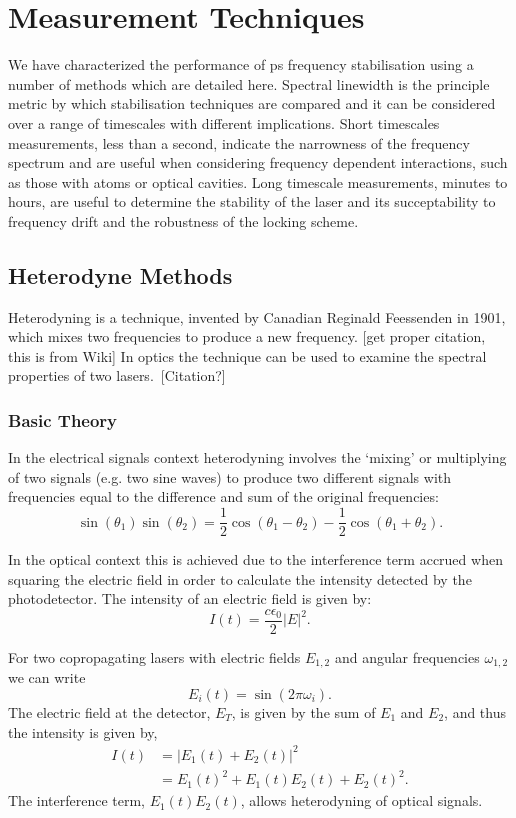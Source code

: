 \section{Measurement Techniques}
We have characterized the performance of \gls*{ps} frequency stabilisation using a number of methods which are detailed here.
Spectral linewidth is the principle metric by which stabilisation techniques are compared and it can be considered over a range of timescales with different implications.
Short timescales measurements, less than a second, indicate the narrowness of the frequency spectrum and are useful when considering frequency dependent interactions, such as those with atoms or optical cavities.
Long timescale measurements, minutes to hours, are useful to determine the stability of the laser and its succeptability to frequency drift and the robustness of the locking scheme.

\subsection{Heterodyne Methods}

Heterodyning is a technique, invented by Canadian Reginald Feessenden in 1901, which mixes two frequencies to produce a new frequency. {\color{red} [get proper citation, this is from Wiki]} In optics the technique can be used to examine the spectral properties of two lasers.~{\color{red}[Citation?]}

\subsubsection{Basic Theory}
In the electrical signals context heterodyning involves the `mixing' or multiplying of two signals (e.g. two sine waves) to produce two different signals with frequencies equal to the difference and sum of the original frequencies:
\begin{equation}
\sin(\theta_1)\sin(\theta_2) = \frac{1}{2} \cos(\theta_1-\theta_2) - \frac{1}{2} \cos(\theta_1+\theta_2).
\end{equation}

In the optical context this is achieved due to the interference term accrued when squaring the electric field in order to calculate the intensity detected by the photodetector. The intensity of an electric field is given by:
\begin{equation}
I(t) = \frac{c\epsilon_0}{2}|E|^2.
\end{equation}

For two copropagating lasers with electric fields $E_{1, 2}$ and angular frequencies $\omega_{1, 2}$ we can write
\begin{equation}
E_{i}(t) = \sin(2\pi \omega_{i}).
\end{equation}
The electric field at the detector, $E_T$, is given by the sum of $E_{1}$ and $E_{2}$, and thus the intensity is given by,
\begin{align}
I(t) &= |E_1(t) + E_2(t)|^2\nonumber\\
&= E_1(t)^2 + E_1(t)E_2(t) + E_2(t)^2.
\end{align}
The interference term, $E_1(t)E_2(t)$, allows heterodyning of optical signals.

